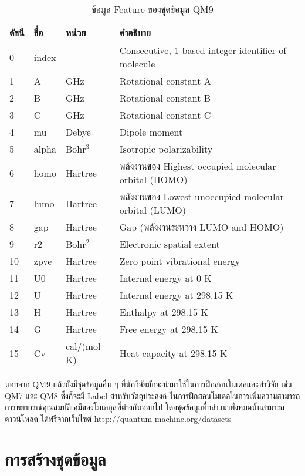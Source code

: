 \begin{table}[H]
    \centering
    \caption{ข้อมูล Feature ของชุดข้อมูล QM9}
    \label{tab:qm9_feature}
    \small
    \begin{tabular}{llll}\toprule
    \textbf{ดัชนี} &\textbf{ชื่อ} &\textbf{หน่วย} &\textbf{คำอธิบาย} \\\midrule
    0 &index &- &Consecutive, 1-based integer identifier of molecule \\
    1 &A &GHz &Rotational constant A \\
    2 &B &GHz &Rotational constant B \\
    3 &C &GHz &Rotational constant C \\
    4 &mu &Debye &Dipole moment \\
    5 &alpha &Bohr$^3$ &Isotropic polarizability \\
    6 &homo &Hartree &พลังงานของ Highest occupied molecular orbital (HOMO) \\
    7 &lumo &Hartree &พลังงานของ Lowest unoccupied molecular orbital (LUMO) \\
    8 &gap &Hartree &Gap (พลังงานระหว่าง LUMO and HOMO) \\
    9 &r2 &Bohr$^2$ &Electronic spatial extent \\
    10 &zpve &Hartree &Zero point vibrational energy \\
    11 &U0 &Hartree &Internal energy at 0 K \\
    12 &U &Hartree &Internal energy at 298.15 K \\
    13 &H &Hartree &Enthalpy at 298.15 K \\
    14 &G &Hartree &Free energy at 298.15 K \\
    15 &Cv &cal/(mol K) &Heat capacity at 298.15 K \\
    \bottomrule
    \end{tabular}
\end{table}

นอกจาก QM9 แล้วยังมีชุดข้อมูลอื่น ๆ ที่นักวิจัยมักจะนำมาใช้ในการฝึกสอนโมเดลและทำวิจัย เช่น QM7 และ QM8 ซึ่งก็จะมี Label สำหรับวัตถุประสงค์%
ในการฝึกสอนโมเดลในการเพิ่มความสามารถการพยากรณ์คุณสมบัติเคมีของโมเลกุลที่ต่างกันออกไป โดยชุดข้อมูลที่กล่าวมาทั้งหมดนั้นสามารถดาวน์โหลด%
ได้ฟรีจากเว็บไซต์ \url{http://quantum-machine.org/datasets}

\section{การสร้างชุดข้อมูล}
